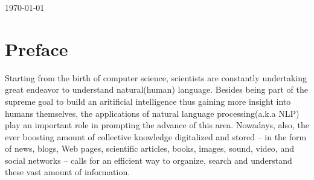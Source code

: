 \documentclass[a4paper]{book}
\begin{document}
\begin{titlepage}


{\large \today}\\[3cm] %


 

\vfill %

\end{titlepage}
\tableofcontents
\pagebreak
\listoffigures
\listoftables
\pagebreak

\chapter*{Preface}
  Starting from the birth of computer science, scientists are constantly
  undertaking great endeavor to understand natural(human) language.
  Besides being part of the supreme goal to build an aritificial
  intelligence thus gaining more insight into humans themselves, the
  applications of natural language processing(a.k.a NLP) play an
  important role in prompting the advance of this area. Nowadays, also,
  the ever boosting amount of collective knowledge digitalized and
  stored -- in the form of news, blogs, Web pages, scientific articles,
  books, images, sound, video, and social networks -- calls for an
  efficient way to organize, search and understand these vast amount of
  information.
\end{document}
